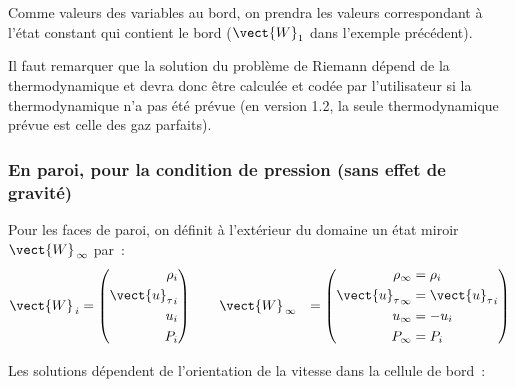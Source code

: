 Comme valeurs des variables au bord, on prendra les valeurs correspondant à
l'état constant qui contient le bord ($\vect{W}_1$ dans l'exemple
précédent).

Il faut remarquer que la solution du problème de Riemann dépend de la
thermodynamique et devra donc être calculée et codée
par l'utilisateur si la thermodynamique n'a pas été prévue
(en version 1.2, la seule
thermodynamique prévue est celle des gaz parfaits).



\subsubsection*{En paroi, pour la condition de pression (sans effet de gravité)}

Pour les faces de paroi, on définit à l'extérieur du domaine
un état miroir $\vect{W}_{\,\infty}$ par~:
\begin{equation}\label{Cfbl_Cfxtcl_eq_paroi_cfxtcl}
\begin{aligned}
\vect{W}_{\,i} &=
\left(
\begin{aligned}
\rho_i\\
{\vect{u}_\tau}_i\\
u_i\\
P_i
\end{aligned}
\right)
\qquad
\vect{W}_{\,\infty} &=
\left(
\begin{aligned}
\rho_\infty &= \rho_i\\
{\vect{u}_\tau}_\infty &= {\vect{u}_\tau}_i\\
u_\infty &= -u_i\\
P_\infty &= P_i
\end{aligned}
\right)
\end{aligned}
\end{equation}

\vspace{0.5cm}

Les solutions dépendent de l'orientation de la vitesse dans la cellule
de bord~:

\vspace{0.5cm}

